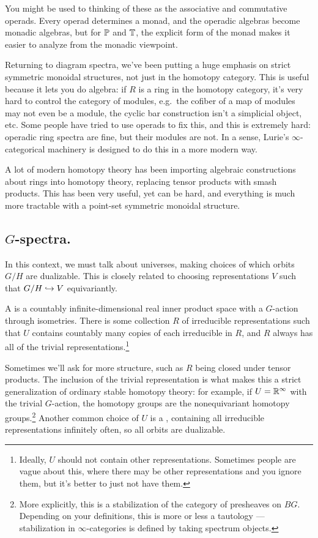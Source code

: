 \begin{rem}
You might be used to thinking of these as the associative and commutative operads. Every operad determines a monad,
and the operadic algebras become monadic algebras, but for $\P$ and $\T$, the explicit form of the monad makes it
easier to analyze from the monadic viewpoint.
\end{rem}
Returning to diagram spectra, we've been putting a huge emphasis on strict symmetric monoidal structures, not just
in the homotopy category. This is useful because it lets you do algebra: if $R$ is a ring in the homotopy category,
it's very hard to control the category of modules, e.g.\ the cofiber of a map of modules may not even be a module,
the cyclic bar construction isn't a simplicial object, etc. Some people have tried to use operads to fix this, and
this is extremely hard: operadic ring spectra are fine, but their modules are not. In a sense, Lurie's
$\infty$-categorical machinery is designed to do this in a more modern way.

A lot of modern homotopy theory has been importing algebraic constructions about rings into homotopy theory,
replacing tensor products with smash products. This has been very useful, yet can be hard, and everything is much
more tractable with a point-set symmetric monoidal structure.
\subsection*{$G$-spectra.}
In this context, we must talk about universes, making choices of which orbits $G/H$ are dualizable. This is closely
related to choosing representations $V$ such that $G/H\inj V$ equivariantly.
\begin{defn}
A  is a countably infinite-dimensional real inner product space with a $G$-action through
isometries. There is some collection $R$ of irreducible representations such that $U$ contains countably many
copies of each irreducible in $R$, and $R$ always has all of the trivial representations.\footnote{Ideally, $U$
should not contain other representations. Sometimes people are vague about this, where there may be other
representations and you ignore them, but it's better to just not have them.}
\end{defn}
Sometimes we'll ask for more structure, such as $R$ being closed under tensor products. The inclusion of the
trivial representation is what makes this a strict generalization of ordinary stable homotopy theory: for example,
if $U = \R^\infty$ with the trivial $G$-action, the homotopy groups are the nonequivariant homotopy
groups.\footnote{More explicitly, this is a stabilization of the category of presheaves on $BG$. Depending on your
definitions, this is more or less a tautology --- stabilization in $\infty$-categories is defined by taking
spectrum objects.} Another common choice of $U$ is a , containing all irreducible
representations infinitely often, so all orbits are dualizable.

